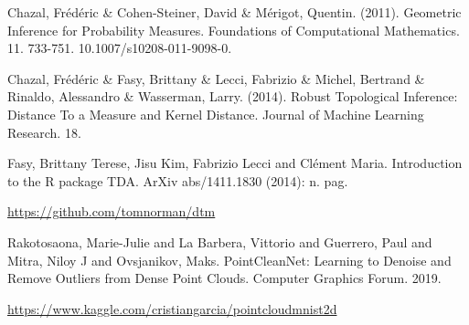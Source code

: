 \documentclass[11pt]{article}
\theoremstyle{definition}
\theoremstyle{definition}
\begin{document}
\begin{thebibliography}{9}
Chazal, Frédéric \& Cohen-Steiner, David \& Mérigot, Quentin. (2011). Geometric Inference for Probability Measures. Foundations of Computational Mathematics. 11. 733-751. 10.1007/s10208-011-9098-0.

Chazal, Frédéric \& Fasy, Brittany \& Lecci, Fabrizio \& Michel, Bertrand \& Rinaldo, Alessandro \& Wasserman, Larry. (2014). Robust Topological Inference: Distance To a Measure and Kernel Distance. Journal of Machine Learning Research. 18.

Fasy, Brittany Terese, Jisu Kim, Fabrizio Lecci and Clément Maria. Introduction to the R package TDA. ArXiv abs/1411.1830 (2014): n. pag.

\url{https://github.com/tomnorman/dtm}

Rakotosaona, Marie-Julie and La Barbera, Vittorio and Guerrero, Paul and Mitra, Niloy J and Ovsjanikov, Maks. PointCleanNet: Learning to Denoise and Remove Outliers from Dense Point Clouds. Computer Graphics Forum. 2019.

\url{https://www.kaggle.com/cristiangarcia/pointcloudmnist2d}

\end{thebibliography}
\end{document}
